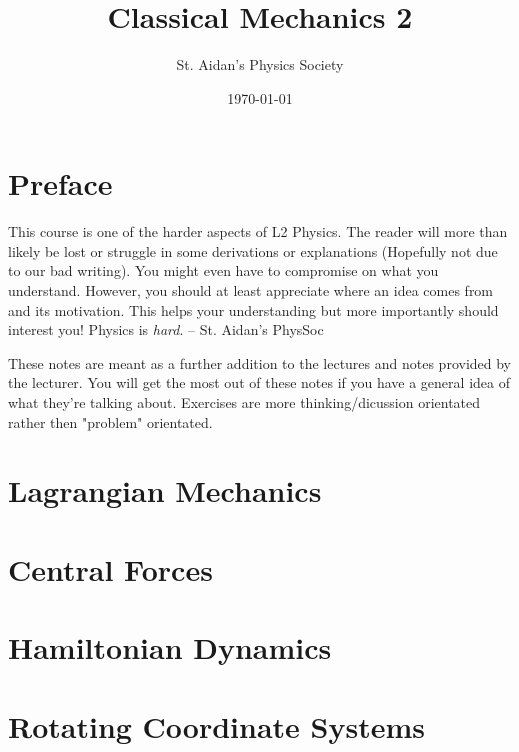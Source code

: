 \documentclass[10pt,%
               a4paper]{physics_notes}
\begin{document}
\title{Classical Mechanics 2}
\author{St. Aidan's Physics Society}
\date{\today}
\maketitle

\tableofcontents
\newpage

\section{Preface}
This course is one of the harder aspects of L2 Physics. The reader will more than likely be lost or struggle in some derivations or explanations (Hopefully not due to our bad writing). You might even have to compromise on what you understand. However, you should at least appreciate where an idea comes from and its motivation. This helps your understanding but more importantly should interest you! Physics is \textit{hard}. -- St. Aidan's PhysSoc\par



These notes are meant as a further addition to the lectures and notes provided by the lecturer. You will get the most out of these notes if you have a general idea of what they're talking about. Exercises are more thinking/dicussion orientated rather then "problem" orientated. 
\newpage

\section{Lagrangian Mechanics}



\section{Central Forces}


\section{Hamiltonian Dynamics}


\section{Rotating Coordinate Systems}


 
\end{document}
